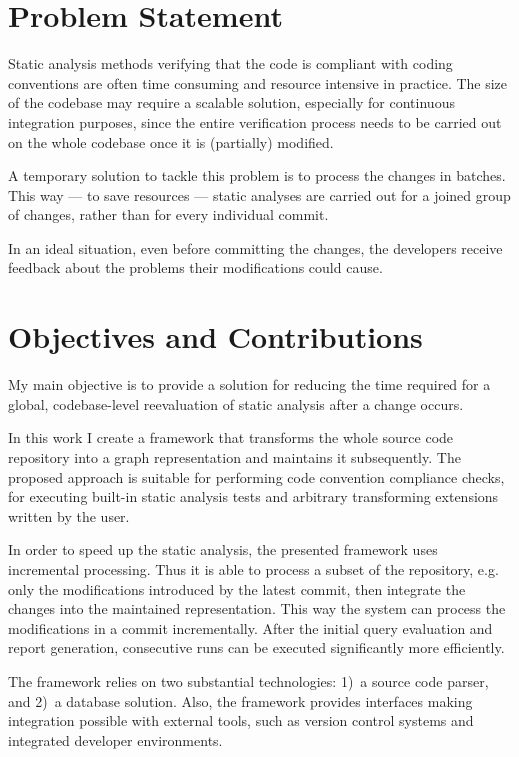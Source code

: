 \section{Problem Statement}

Static analysis methods verifying that the code is compliant with coding conventions are often time consuming and resource intensive in practice. The size of the codebase may require a scalable solution, especially for continuous integration purposes, since the entire verification process needs to be carried out on the whole codebase once it is (partially) modified.

A temporary solution to tackle this problem is to process the changes in batches. This way --- to save resources --- static analyses are carried out for a joined group of changes, rather than for every individual commit.

In an ideal situation, even before committing the changes, the developers receive feedback about the problems their modifications could cause.


\section{Objectives and Contributions}

My main objective is to provide a solution for reducing the time required for a global, codebase-level reevaluation of static analysis after a change occurs.

In this work I create a framework that transforms the whole source code repository into a graph representation and maintains it subsequently. The proposed approach is suitable for performing code convention compliance checks, for executing built-in static analysis tests and arbitrary transforming extensions written by the user.

In order to speed up the static analysis, the presented framework uses incremental processing. Thus it is able to process a subset of the repository, e.g. only the modifications introduced by the latest commit, then integrate the changes into the maintained representation. This way the system can process the modifications in a commit incrementally. After the initial query evaluation and report generation, consecutive runs can be executed significantly more efficiently.

The framework relies on two substantial technologies: 1)~a source code parser, and 2)~a database solution. Also, the framework provides interfaces making integration possible with external tools, such as version control systems and integrated developer environments.


